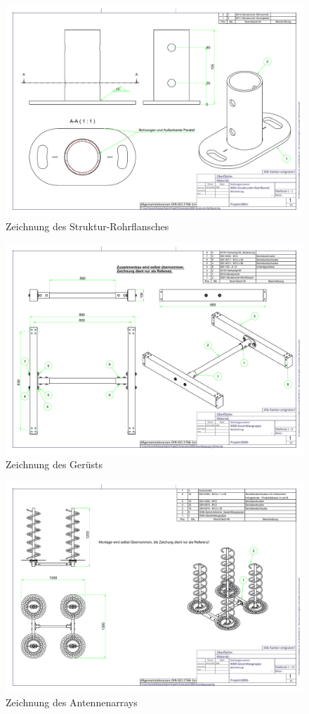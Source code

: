 \begin{figure}[h!]
	\includegraphics[angle=90,width=\textwidth]{../ref/0001-Struktrurohr-Rohrflansch.pdf}
	\caption{Zeichnung des Struktur-Rohrflansches}
	\label{fig:Zeichnung-Strukturrohrflansch}
\end{figure}

\begin{figure}[h!]
	\includegraphics[angle=90,width=\textwidth]{../ref/0000-Gesamtbaugruppe_Rahmen.pdf}
	\caption{Zeichnung des Gerüsts}
	\label{fig:Zeichnung-Gerüst}
\end{figure}

\begin{figure}[h!]
	\includegraphics[angle=90,width=\textwidth]{../ref/0000-Gesamtbaugruppe.pdf}
	\caption{Zeichnung des Antennenarrays}
	\label{fig:Zeichnung-Antennenarray}
\end{figure}

